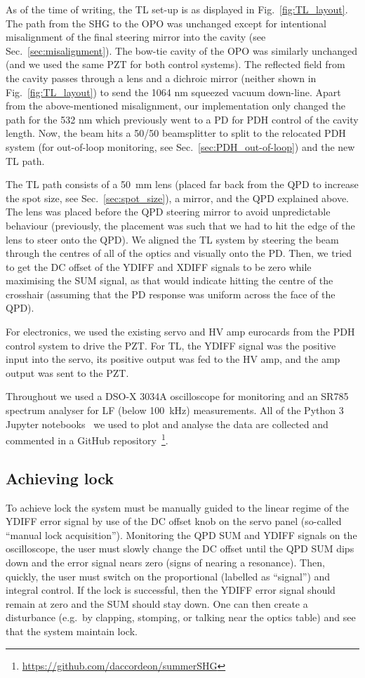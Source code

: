 \documentclass[aps,pra,superscriptaddress,reprint,nofootinbib]{revtex4-1}
\begin{document}
As of the time of writing, the TL set-up is as displayed in Fig.~\ref{fig:TL_layout}. The path from the SHG to the OPO was unchanged except for intentional misalignment of the final steering mirror into the cavity (see Sec.~\ref{sec:misalignment}). The bow-tie cavity of the OPO was similarly unchanged (and we used the same PZT for both control systems). The reflected field from the cavity passes through a lens and a dichroic mirror (neither shown in Fig.~\ref{fig:TL_layout}) to send the 1064 nm squeezed vacuum down-line. Apart from the above-mentioned misalignment, our implementation only changed the path for the 532 nm which previously went to a PD for PDH control of the cavity length. Now, the beam hits a 50/50 beamsplitter to split to the relocated PDH system (for out-of-loop monitoring, see Sec.~\ref{sec:PDH_out-of-loop}) and the new TL path.

The TL path consists of a 50~mm lens (placed far back from the QPD to increase the spot size, see Sec.~\ref{sec:spot_size}), a mirror, and the QPD explained above. The lens was placed before the QPD steering mirror to avoid unpredictable behaviour (previously, the placement was such that we had to hit the edge of the lens to steer onto the QPD). We aligned the TL system by steering the beam through the centres of all of the optics and visually onto the PD. Then, we tried to get the DC offset of the YDIFF and XDIFF signals to be zero while maximising the SUM signal, as that would indicate hitting the centre of the crosshair (assuming that the PD response was uniform across the face of the QPD).

For electronics, we used the existing servo and HV amp eurocards from the PDH control system to drive the PZT. For TL, the YDIFF signal was the positive input into the servo, its positive output was fed to the HV amp, and the amp output was sent to the PZT.

Throughout we used a DSO-X 3034A oscilloscope for monitoring and an SR785 spectrum analyser for LF (below 100~kHz) measurements. All of the Python 3 Jupyter notebooks~\cite{python,ipython,jupyter} we used to plot and analyse the data are collected and commented in a GitHub repository~\footnote{\url{https://github.com/daccordeon/summerSHG}}.


\subsection{Achieving lock}

To achieve lock the system must be manually guided to the linear regime of the YDIFF error signal by use of the DC offset knob on the servo panel (so-called “manual lock acquisition”). Monitoring the QPD SUM and YDIFF signals on the oscilloscope, the user must slowly change the DC offset until the QPD SUM dips down and the error signal nears zero (signs of nearing a resonance). Then, quickly, the user must switch on the proportional (labelled as “signal”) and integral control. If the lock is successful, then the YDIFF error signal should remain at zero and the SUM should stay down. One can then create a disturbance (e.g.\ by clapping, stomping, or talking near the optics table) and see that the system maintain lock. 
\end{document}

